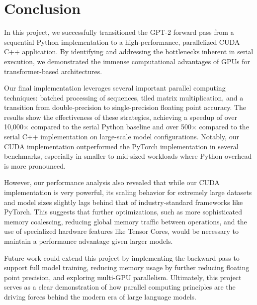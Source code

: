 \section{Conclusion}

In this project, we successfully transitioned the GPT-2 forward pass from a sequential Python implementation to a 
high-performance, parallelized CUDA C++ application. By identifying and addressing the bottlenecks 
inherent in serial execution, we demonstrated the immense computational advantages of GPUs for transformer-based 
architectures.

Our final implementation leverages several important parallel computing techniques: batched processing of sequences, tiled 
matrix multiplication, and a transition from double-precision to single-precision floating point accuracy. The 
results show the effectiveness of these strategies, achieving a speedup of over 10,000$\times$ compared to the serial Python 
baseline and over 500$\times$ compared to the serial C++ implementation on large-scale model configurations. Notably, our 
CUDA implementation outperformed the PyTorch implementation in several benchmarks, especially in smaller 
to mid-sized workloads where Python overhead is more pronounced.

However, our performance analysis also revealed that while our CUDA implementation is very powerful, its scaling 
behavior for extremely large datasets and model sizes slightly lags behind that of industry-standard frameworks like 
PyTorch. This suggests that further optimizations, such as more sophisticated memory coalescing, reducing 
global memory traffic between operations, and the use of specialized hardware features like Tensor Cores, would be 
necessary to maintain a performance advantage given larger models.

Future work could extend this project by implementing the backward pass to support full model training, reducing memory 
usage by further reducing floating point precision, and exploring multi-GPU parallelism. Ultimately, this project serves 
as a clear demonstration of how parallel computing principles are the driving forces behind the modern era of 
large language models.